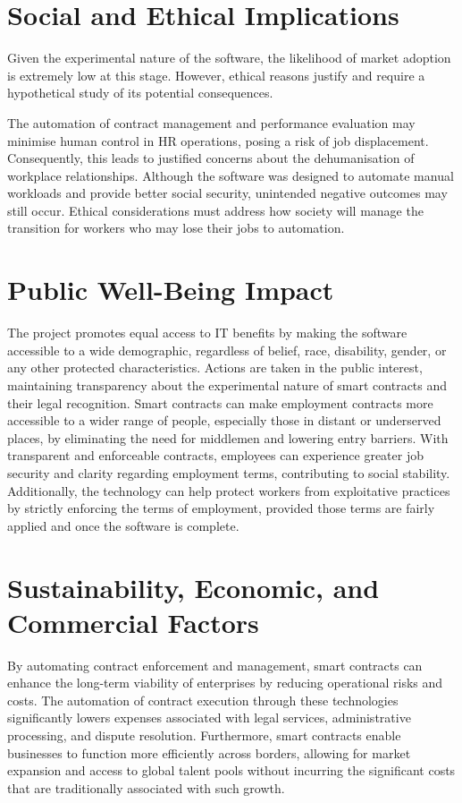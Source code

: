 \section{Social and Ethical Implications}

Given the experimental nature of the software, the likelihood of market adoption is extremely low at this stage. However, ethical reasons justify and require a hypothetical study of its potential consequences.

The automation of contract management and performance evaluation may minimise human control in HR operations, posing a risk of job displacement. Consequently, this leads to justified concerns about the dehumanisation of workplace relationships. Although the software was designed to automate manual workloads and provide better social security, unintended negative outcomes may still occur. Ethical considerations must address how society will manage the transition for workers who may lose their jobs to automation.

\section{Public Well-Being Impact}

The project promotes equal access to IT benefits by making the software accessible to a wide demographic, regardless of belief, race, disability, gender, or any other protected characteristics. Actions are taken in the public interest, maintaining transparency about the experimental nature of smart contracts and their legal recognition. Smart contracts can make employment contracts more accessible to a wider range of people, especially those in distant or underserved places, by eliminating the need for middlemen and lowering entry barriers. With transparent and enforceable contracts, employees can experience greater job security and clarity regarding employment terms, contributing to social stability. Additionally, the technology can help protect workers from exploitative practices by strictly enforcing the terms of employment, provided those terms are fairly applied and once the software is complete.

\section{Sustainability, Economic, and Commercial Factors}

By automating contract enforcement and management, smart contracts can enhance the long-term viability of enterprises by reducing operational risks and costs. The automation of contract execution through these technologies significantly lowers expenses associated with legal services, administrative processing, and dispute resolution. Furthermore, smart contracts enable businesses to function more efficiently across borders, allowing for market expansion and access to global talent pools without incurring the significant costs that are traditionally associated with such growth.

